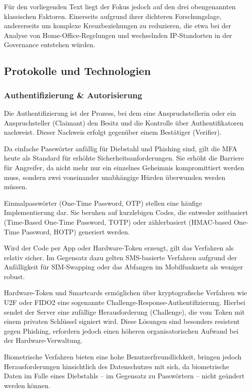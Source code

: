 Für den vorliegenden Text liegt der Fokus jedoch auf den drei obengenannten klassischen Faktoren. Einerseits aufgrund ihrer dichteren Forschungslage, andererseits um komplexe Kreuzbeziehungen zu reduzieren, die etwa bei der Analyse von Home-Office-Regelungen und wechselnden IP-Standorten in der Governance entstehen würden.

\subsection{Protokolle und Technologien}

\subsubsection{Authentifizierung \& Autorisierung}
Die Authentifizierung ist der Prozess, bei dem eine Anspruchstellerin oder ein Anspruchsteller (Claimant) den Besitz und die Kontrolle über Authentifikatoren nachweist. Dieser Nachweis erfolgt gegenüber einem Bestätiger (Verifier).

Da einfache Passwörter anfällig für Diebstahl und Phishing sind, gilt die MFA heute als Standard für erhöhte Sicherheitsanforderungen. Sie erhöht die Barriere für Angreifer, da nicht mehr nur ein einzelnes Geheimnis kompromittiert werden muss, sondern zwei voneinander unabhängige Hürden überwunden werden müssen.

Einmalpasswörter (One-Time Password, OTP) stellen eine häufige Implementierung dar. Sie beruhen auf kurzlebigen Codes, die entweder zeitbasiert (Time-Based One-Time Password, TOTP) oder zählerbasiert (HMAC-based One-Time Password, HOTP) generiert werden. 

Wird der Code per App oder Hardware-Token erzeugt, gilt das Verfahren als relativ sicher. Im Gegensatz dazu gelten SMS-basierte Verfahren aufgrund der Anfälligkeit für SIM-Swapping oder das Abfangen im Mobilfunknetz als weniger robust.

Hardware-Token und Smartcards ermöglichen über kryptografische Verfahren wie U2F oder FIDO2 eine sogenannte Challenge-Response-Authentifizierung. Hierbei sendet der Server eine zufällige Herausforderung (Challenge), die vom Token mit einem privaten Schlüssel signiert wird. Diese Lösungen sind besonders resistent gegen Phishing, erfordern jedoch einen höheren organisatorischen Aufwand bei der Hardware-Verwaltung.

Biometrische Verfahren bieten eine hohe Benutzerfreundlichkeit, bringen jedoch Herausforderungen hinsichtlich des Datenschutzes mit sich, da biometrische Daten im Falle eines Diebstahls – im Gegensatz zu Passwörtern – nicht geändert werden können.

